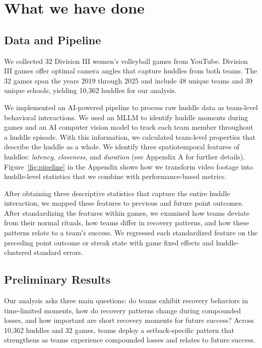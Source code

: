 \documentclass[12pt]{article}          %
\begin{document}
\section{What we have done}
\subsection{Data and Pipeline}
We collected 32 Division III women's volleyball games from YouTube. Division III games offer optimal camera angles that capture huddles from both teams. The 32 games span the years 2019 through 2025 and include 48 unique teams and 39 unique schools, yielding 10,362 huddles for our analysis. 

We implemented an AI-powered pipeline to process raw huddle data as team-level behavioral interactions. We used an MLLM to identify huddle moments during games and an AI computer vision model to track each team member throughout a huddle episode. With this information, we calculated team-level properties that describe the huddle as a whole. We identify three spatiotemporal features of huddles: \textit{latency}, \textit{closeness}, and \textit{duration} (see Appendix A for further details). Figure~\ref{fig:pipeline} in the Appendix shows how we transform video footage into huddle-level statistics that we combine with performance-based metrics. 

After obtaining three descriptive statistics that capture the entire huddle interaction, we mapped these features to previous and future point outcomes. After standardizing the features within games, we examined how teams deviate from their normal rituals, how teams differ in recovery patterns, and how these patterns relate to a team's success. We regressed each standardized feature on the preceding point outcome or streak state with game fixed effects and huddle-clustered standard errors. 



\subsection{Preliminary Results}
Our analysis asks three main questions: do teams exhibit recovery behaviors in time-limited moments, how do recovery patterns change during compounded losses, and how important are short recovery moments for future success? Across 10,362 huddles and 32 games, teams deploy a setback-specific pattern that strengthens as teams experience compounded losses and relates to future success.
\end{document}
